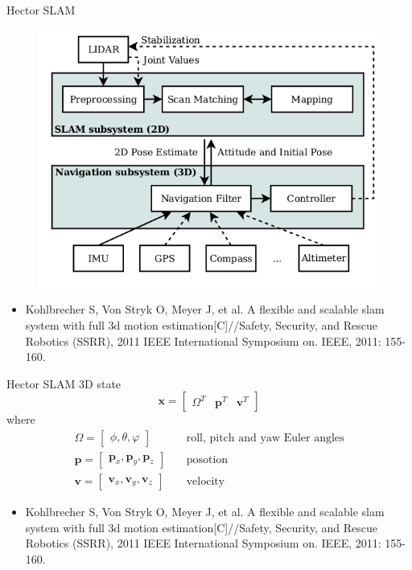 \documentclass[14pt,hyperref={CJKbookmarks=true}]{beamer}
\theoremstyle{plain}
\theoremstyle{definition}
\theoremstyle{remark}
\begin{document}
\begin{frame}{Hector SLAM}
\begin{figure}
\centering
\includegraphics[width=0.5\linewidth]{hector-slam-system.png}
\end{figure}
\begin{itemize}\tiny
\item Kohlbrecher S, Von Stryk O, Meyer J, et al. A flexible and scalable slam system with full 3d motion estimation[C]//Safety, Security, and Rescue Robotics (SSRR), 2011 IEEE International Symposium on. IEEE, 2011: 155-160.
\end{itemize}
\end{frame}


\begin{frame}{Hector SLAM}
3D state
\begin{equation*}
\mathbf{x}=\begin{bmatrix}
\Omega^T & \mathbf{p}^T & \mathbf{v}^T
\end{bmatrix}
\end{equation*}
where
\begin{equation*}
\begin{split}
\Omega=\begin{bmatrix}
\phi,\theta,\varphi
\end{bmatrix} &\quad
\text{roll, pitch and yaw Euler angles}\\
\mathbf{p}=\begin{bmatrix}
\mathbf{p}_x,\mathbf{p}_y,\mathbf{p}_z
\end{bmatrix} &\quad
\text{posotion}\\
\mathbf{v}=\begin{bmatrix}
\mathbf{v}_x,\mathbf{v}_y,\mathbf{v}_z
\end{bmatrix} &\quad
\text{velocity}
\end{split}
\end{equation*}
\begin{itemize}\tiny
\item Kohlbrecher S, Von Stryk O, Meyer J, et al. A flexible and scalable slam system with full 3d motion estimation[C]//Safety, Security, and Rescue Robotics (SSRR), 2011 IEEE International Symposium on. IEEE, 2011: 155-160.
\end{itemize}
\end{frame}
\end{document}
